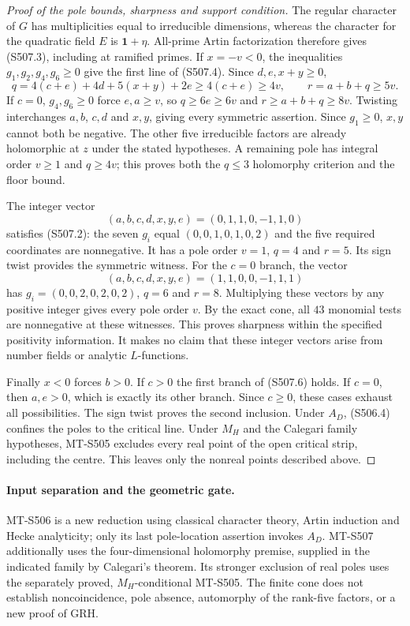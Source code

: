 \begin{proof}[Proof of the pole bounds, sharpness and support condition]
The regular character of $G$ has multiplicities equal to
irreducible dimensions, whereas the character for the quadratic
field $E$ is $\mathbf1+\eta$.  All-prime Artin factorization
therefore gives (S507.3), including at ramified primes.
If $x=-v<0$, the inequalities $g_1,g_2,g_4,g_6\ge0$
give the first line of (S507.4).  Since $d,e,x+y\ge0$,
\[
 q=4(c+e)+4d+5(x+y)+2e\ge4(c+e)\ge4v,
 \qquad r=a+b+q\ge5v.
\]
If $c=0$, $g_4,g_6\ge0$ force $e,a\ge v$, so
$q\ge6e\ge6v$ and $r\ge a+b+q\ge8v$.
Twisting interchanges $a,b$, $c,d$ and $x,y$, giving every
symmetric assertion.  Since $g_1\ge0$, $x,y$ cannot both be
negative.  The other five irreducible factors are already
holomorphic at $z$ under the stated hypotheses.  A remaining
pole has integral order $v\ge1$ and $q\ge4v$; this proves both
the $q\le3$ holomorphy criterion and the floor bound.

The integer vector
\[
        (a,b,c,d,x,y,e)=(0,1,1,0,-1,1,0)
 \tag{S507.8}
\]
satisfies (S507.2): the seven $g_i$ equal
$(0,0,1,0,1,0,2)$ and the five required coordinates are
nonnegative.  It has a pole order $v=1$, $q=4$ and $r=5$.
Its sign twist provides the symmetric witness.  For the
$c=0$ branch, the vector
\[
        (a,b,c,d,x,y,e)=(1,1,0,0,-1,1,1)
 \tag{S507.9}
\]
has $g_i=(0,0,2,0,2,0,2)$, $q=6$ and $r=8$.
Multiplying these vectors by any positive integer gives every
pole order $v$.  By the exact cone, all $43$ monomial tests are
nonnegative at these witnesses.  This proves sharpness within
the specified positivity information.  It makes no claim that
these integer vectors arise from number fields or analytic
$L$-functions.

Finally $x<0$ forces $b>0$.  If $c>0$ the first branch of
(S507.6) holds.  If $c=0$, then $a,e>0$, which is exactly
its other branch.  Since $c\ge0$, these cases exhaust all
possibilities.  The sign twist proves the second inclusion.
Under $A_D$, (S506.4) confines the poles to the critical line.
Under $M_H$ and the Calegari family hypotheses, MT-S505 excludes
every real point of the open critical strip, including the
centre.  This leaves only the nonreal points described above.
\end{proof}

\paragraph{Input separation and the geometric gate.}
MT-S506 is a new reduction using classical character theory,
Artin induction and Hecke analyticity; only its last pole-location
assertion invokes $A_D$.  MT-S507 additionally uses the
four-dimensional holomorphy premise, supplied in the indicated
family by Calegari's theorem.  Its stronger exclusion of real
poles uses the separately proved, $M_H$-conditional MT-S505.
The finite cone does not establish noncoincidence, pole absence,
automorphy of the rank-five factors, or a new proof of GRH.

